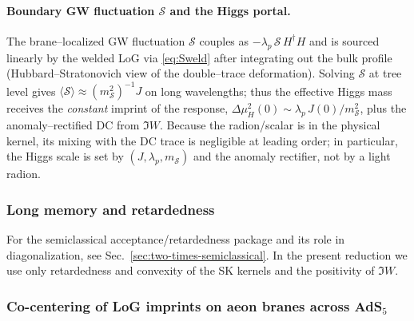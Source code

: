 \documentclass[10pt]{article}
\theoremstyle{definition}
\theoremstyle{plain}
\begin{document}
\paragraph{Boundary GW fluctuation \texorpdfstring{$\mathcal S$}{S} and the Higgs portal.}\label{par:uom-main-088}
The brane–localized GW fluctuation $\mathcal S$ couples as $-\lambda_p\,\mathcal S\,H^\dagger H$ and is sourced linearly by the welded LoG via \eqref{eq:Sweld} after integrating out the bulk profile (Hubbard–Stratonovich view of the double–trace deformation).
Solving $\mathcal S$ at tree level gives
\(
\langle \mathcal S\rangle \approx (m_{\mathcal S}^2)^{-1} J
\)
on long wavelengths; thus the effective Higgs mass receives the \emph{constant} imprint of the response,
\(
\Delta\mu_H^2(0)\sim \lambda_p\, J(0)/m_{\mathcal S}^2
\),
plus the anomaly–rectified DC from $\Im W$. 
Because the radion/scalar is in the physical kernel, its mixing with the DC trace is negligible at leading order; in particular, the Higgs scale is set by $(J,\lambda_p,m_{\mathcal S})$ and the anomaly rectifier, not by a light radion.

\subsubsection*{Long memory and retardedness}
\label{subsubsec:memory-ret}

For the semiclassical acceptance/retardedness package and its role in diagonalization, see
Sec.~\ref{sec:two-times-semiclassical}. In the present reduction we use only retardedness
and convexity of the SK kernels and the positivity of $\Im W$.

\subsubsection*{\texorpdfstring{Co-centering of LoG imprints on aeon branes across AdS$_5$}{Co-centering of LoG imprints on aeon branes across AdS5}}\label{subsubsec:uom-main-012}
\end{document}
